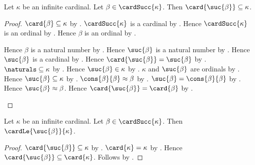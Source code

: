 \begin{theorem}\label{inclusive_initial_segment_below_cardinal_successor}
    Let $\kappa$ be an infinite cardinal.
    Let $\beta\in\cardSucc{\kappa}$.
    Then $\card{\suc{\beta}}\subseteq\kappa$.
\end{theorem}
\begin{proof}
    $\card{\beta}\subseteq\kappa$
        by .
    $\cardSucc{\kappa}$ is a cardinal
        by .
    Hence $\cardSucc{\kappa}$ is an ordinal
        by .
    Hence $\beta$ is an ordinal by .
    \begin{byCase}
            Hence $\beta$ is a natural number
                by .
            Hence $\suc{\beta}$ is a natural number
                by .
            Hence $\suc{\beta}$ is a cardinal
                by .
            Hence $\card{\suc{\beta}}=\suc{\beta}$
                by .
            $\naturals\subseteq\kappa$
                by .
            Hence $\suc{\beta}\in\kappa$ by .
            $\kappa$ and $\suc{\beta}$ are ordinals
                by .
            Hence $\suc{\beta}\subseteq\kappa$
                by .
            $\cons{\beta}{\beta}\approx\beta$
                by .
            $\suc{\beta}=\cons{\beta}{\beta}$ by .
            Hence $\suc{\beta}\approx\beta$.
            Hence $\card{\suc{\beta}}=\card{\beta}$
                by .
    \end{byCase}
\end{proof}

\begin{corollary}\label{inclusive_initial_segment_cardinal_le}
    Let $\kappa$ be an infinite cardinal.
    Let $\beta\in\cardSucc{\kappa}$.
    Then $\cardLe{\suc{\beta}}{\kappa}$.
\end{corollary}
\begin{proof}
    $\card{\suc{\beta}}\subseteq\kappa$
        by .
    $\card{\kappa}=\kappa$ by .
    Hence $\card{\suc{\beta}}\subseteq\card{\kappa}$.
    Follows by .
\end{proof}
